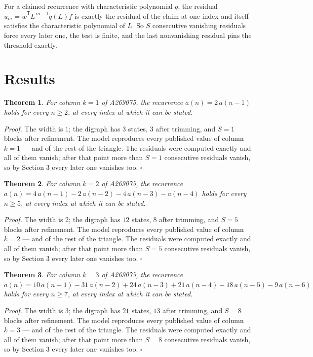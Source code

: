 \documentclass[11pt]{article}
\newtheorem{theorem}{Theorem}
\theoremstyle{definition}
\begin{document}
For a claimed recurrence with characteristic polynomial $q$, the residual $u_m = \tilde w^{\mathsf T}L^{\,m-1}q(L)\tilde f$ is exactly the residual of the claim at one index and itself satisfies the characteristic polynomial of $L$. So $S$ consecutive vanishing residuals force every later one, the test is finite, and the last nonvanishing residual pins the threshold exactly.

\section{Results}

\begin{theorem} For column $k = 1$ of A269075, the recurrence $a(n) = 2\,a(n-1)$ holds for every $n \ge 2$, at every index at which it can be stated.\end{theorem}

{\itshape Proof.} The width is $1$; the digraph has $3$ states, $3$ after trimming, and $S = 1$ blocks after refinement. The model reproduces every published value of column $k = 1$ --- and of the rest of the triangle. The residuals were computed exactly and all of them vanish; after that point more than $S = 1$ consecutive residuals vanish, so by Section 3 every later one vanishes too. $\square$

\begin{theorem} For column $k = 2$ of A269075, the recurrence $a(n) = 4\,a(n-1) - 2\,a(n-2) - 4\,a(n-3) - a(n-4)$ holds for every $n \ge 5$, at every index at which it can be stated.\end{theorem}

{\itshape Proof.} The width is $2$; the digraph has $12$ states, $8$ after trimming, and $S = 5$ blocks after refinement. The model reproduces every published value of column $k = 2$ --- and of the rest of the triangle. The residuals were computed exactly and all of them vanish; after that point more than $S = 5$ consecutive residuals vanish, so by Section 3 every later one vanishes too. $\square$

\begin{theorem} For column $k = 3$ of A269075, the recurrence $a(n) = 10\,a(n-1) - 31\,a(n-2) + 24\,a(n-3) + 21\,a(n-4) - 18\,a(n-5) - 9\,a(n-6)$ holds for every $n \ge 7$, at every index at which it can be stated.\end{theorem}

{\itshape Proof.} The width is $3$; the digraph has $21$ states, $13$ after trimming, and $S = 8$ blocks after refinement. The model reproduces every published value of column $k = 3$ --- and of the rest of the triangle. The residuals were computed exactly and all of them vanish; after that point more than $S = 8$ consecutive residuals vanish, so by Section 3 every later one vanishes too. $\square$
\end{document}
